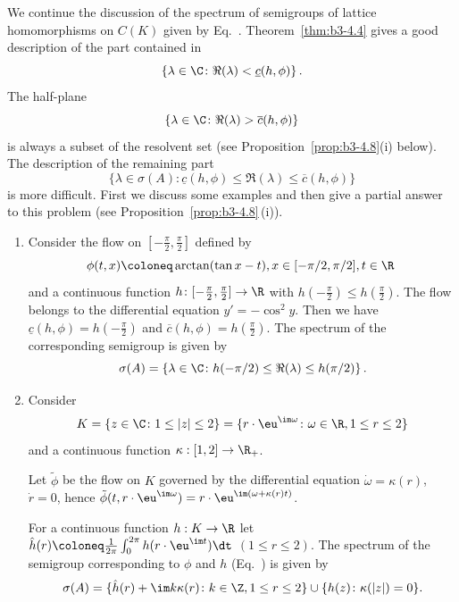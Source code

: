 We continue the discussion of the spectrum of semigroups of lattice homomorphisms on $C(K)$ given by Eq.~.
Theorem~\ref{thm:b3-4.4} gives a good description of the part contained in 
\[
\{\lambda \in \C \colon \Re(\lambda) < \underline{c}(h,\phi)\}\,.
\]
The half-plane 
\[
\{\lambda \in \C \colon \Re(\lambda) > \overline{c}(h,\phi)\}
\] 
is always a subset of the resolvent set (see Proposition~\ref{prop:b3-4.8}(i) below).
The description of the remaining part 
\[\{\lambda \in \sigma(A) \colon \underline{c}(h,\phi) \leq \Re(\lambda) \leq \overline{c}(h,\phi)\}
\]
is more difficult.
First we discuss some examples and then give a partial answer to this problem (see Proposition~\ref{prop:b3-4.8}\,(i)).
\begin{example}\label{ex:b3-4.7}
	\begin{enumerate}[\upshape (i), wide, labelindent=.25em]
		\item 
		Consider the flow on $[-\frac{\pi}{2},\frac{\pi}{2}]$ defined by
		\[
		\phi(t,x)\coloneq \arctan(\tan x - t) , x \in [-{\pi}/{2},{\pi}/{2}], 
		t \in \R\
		\] 
		and a continuous function $h \colon [-\frac{\pi}{2},\frac{\pi}{2}] \to \R$ with $h(-\frac{\pi}{2}) \leq h(\frac{\pi}{2})$. The flow belongs to the differential equation $y' = -\cos^2y$. 
		Then we have $\underline{c}(h,\phi) = h(-\frac{\pi}{2})$ and $\overline{c}(h,\phi) = h(\frac{\pi}{2})$.
		The spectrum of the corresponding semigroup is given by 
		\[
		\sigma(A) = \left\{\lambda \in \C \colon h(-\pi/2) \leq \Re(\lambda) \leq h(\pi/2)\right\}.
		\]
		
		\item 
		Consider 
        \[
        K = \{z \in \C \colon 1 \leq |z| \leq 2\} = \{r\cdot \eu^{\mathcal{\im\omega}} \colon \omega\in \R, 1 \leq r \leq 2\}
         \]
         and a continuous function $\kappa: [1,2] \to \R_+$.
		
		Let $\tilde{\phi}$ be the flow on $K$ governed by the differential equation $\dot{\omega} = \kappa(r)$, $\dot{r} = 0$, hence $\tilde{\phi}(t,r\cdot \eu^{\im\omega}) = r\cdot \eu^{\im(\omega + \kappa(r)t)}$.
		
		For a continuous function $h: K \to \R$ let $\hat{h}(r) \coloneq \frac{1}{2\pi}\int_{0}^{2\pi} h(r\cdot \eu^{\im t}) \dt$ $(1 \leq r \leq 2)$.
		The spectrum of the semigroup corresponding to $\phi$ and $h$ (\cf Eq.~\myeqpageref{eq:b3-4.1}) is given by
		\[
		\sigma(A) = \{\hat{h}(r) +  \im k\kappa(r) \colon k \in \Z, 1 \leq r \leq 2\} \cup \{h(z) \colon \kappa(|z|) = 0\}.
		\]
	\end{enumerate}
\end{example}

